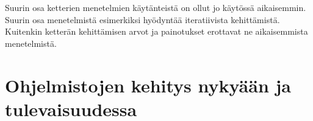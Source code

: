 \documentclass[finnish,12pt]{tktltiki2}
\theoremstyle{definition}
\theoremstyle{remark}
\begin{document}
Suurin osa ketterien menetelmien käytänteistä on ollut jo käytössä aikaisemmin. Suurin osa menetelmistä esimerkiksi hyödyntää iteratiivista kehittämistä\cite{DBLP:journals/ac/CohenLC04}. Kuitenkin ketterän kehittämisen arvot ja painotukset erottavat ne aikaisemmista menetelmistä.


\section{Ohjelmistojen kehitys nykyään ja tulevaisuudessa}

%
%
% 
%







% 
\end{document}
